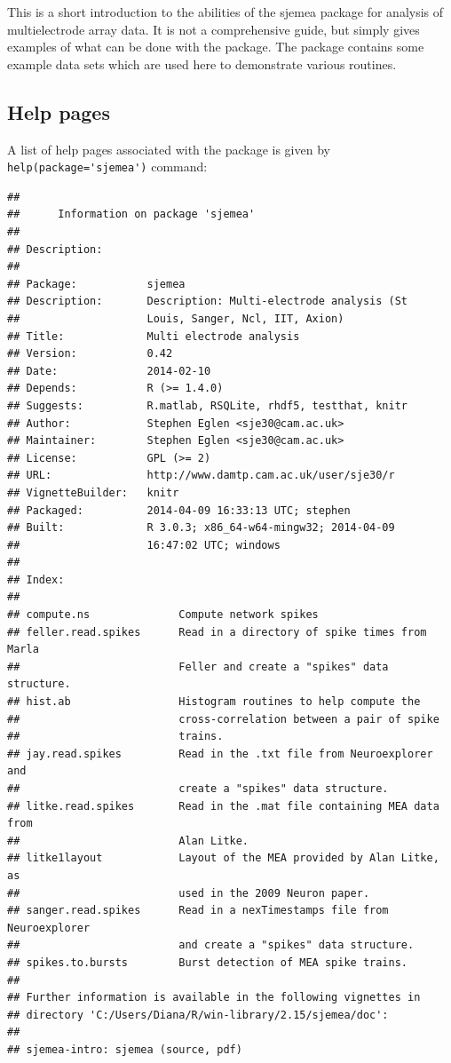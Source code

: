 \documentclass{article}\usepackage[]{graphicx}\usepackage[]{color}
\makeatletter
\newenvironment{kframe}{%
 \def\at@end@of@kframe{}%
 \ifinner\ifhmode%
  \def\at@end@of@kframe{\end{minipage}}%
  \begin{minipage}{\columnwidth}%
 \fi\fi%
 \def\FrameCommand##1{\hskip\@totalleftmargin \hskip-\fboxsep
 \colorbox{shadecolor}{##1}\hskip-\fboxsep
     \hskip-\linewidth \hskip-\@totalleftmargin \hskip\columnwidth}%
 \MakeFramed {\advance\hsize-\width
   \@totalleftmargin\z@ \linewidth\hsize
   \@setminipage}}%
 {\par\unskip\endMakeFramed%
 \at@end@of@kframe}
\newenvironment{knitrout}{}{} %
\makeatother
\begin{document}
This is a short introduction to the abilities of the sjemea package
for analysis of multielectrode array data.  It is not a comprehensive
guide, but simply gives examples of what can be done with the package.
The package contains some example data sets which are used here to
demonstrate various routines.

\subsection*{Help pages}
A list of help pages associated with the package is given by
\verb+help(package='sjemea')+ command:
\begin{knitrout}
\color{fgcolor}\begin{kframe}
\begin{verbatim}
## 
## 		Information on package 'sjemea'
## 
## Description:
## 
## Package:           sjemea
## Description:       Description: Multi-electrode analysis (St
##                    Louis, Sanger, Ncl, IIT, Axion)
## Title:             Multi electrode analysis
## Version:           0.42
## Date:              2014-02-10
## Depends:           R (>= 1.4.0)
## Suggests:          R.matlab, RSQLite, rhdf5, testthat, knitr
## Author:            Stephen Eglen <sje30@cam.ac.uk>
## Maintainer:        Stephen Eglen <sje30@cam.ac.uk>
## License:           GPL (>= 2)
## URL:               http://www.damtp.cam.ac.uk/user/sje30/r
## VignetteBuilder:   knitr
## Packaged:          2014-04-09 16:33:13 UTC; stephen
## Built:             R 3.0.3; x86_64-w64-mingw32; 2014-04-09
##                    16:47:02 UTC; windows
## 
## Index:
## 
## compute.ns              Compute network spikes
## feller.read.spikes      Read in a directory of spike times from Marla
##                         Feller and create a "spikes" data structure.
## hist.ab                 Histogram routines to help compute the
##                         cross-correlation between a pair of spike
##                         trains.
## jay.read.spikes         Read in the .txt file from Neuroexplorer and
##                         create a "spikes" data structure.
## litke.read.spikes       Read in the .mat file containing MEA data from
##                         Alan Litke.
## litke1layout            Layout of the MEA provided by Alan Litke, as
##                         used in the 2009 Neuron paper.
## sanger.read.spikes      Read in a nexTimestamps file from Neuroexplorer
##                         and create a "spikes" data structure.
## spikes.to.bursts        Burst detection of MEA spike trains.
## 
## Further information is available in the following vignettes in
## directory 'C:/Users/Diana/R/win-library/2.15/sjemea/doc':
## 
## sjemea-intro: sjemea (source, pdf)
\end{verbatim}
\end{kframe}
\end{knitrout}
\end{document}
